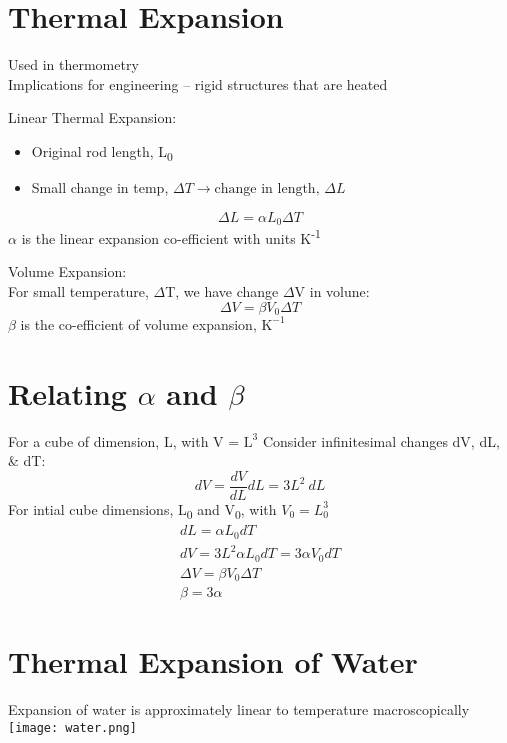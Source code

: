 \documentclass[a4paper, 11pt, fleqn, normalem]{report}
\begin{document}
\section{Thermal Expansion}
Used in thermometry \\
Implications for engineering -- rigid structures that are heated

Linear Thermal Expansion:
\begin{itemize}
    \item Original rod length, L\textsubscript{0}
    \item Small change in temp, ${\Delta}T \rightarrow \text{change in length, } {\Delta}L$
\end{itemize}
\begin{equation*}
    {\Delta}L = {\alpha}L_{0}{\Delta}T
\end{equation*}
$\alpha$ is the linear expansion co-efficient with units K\textsuperscript{-1}

Volume Expansion:\\
For small temperature, $\Delta$T, we have change $\Delta$V in volune:
\begin{equation*}
    {\Delta}V = {\beta}V_{0}{\Delta}T
\end{equation*}
$\beta$ is the co-efficient of volume expansion, $\text{K}^{-1}$

\section{Relating ${\alpha}$ and ${\beta}$}
For a cube of dimension, L, with V = $\text{L}^{3}$
Consider infinitesimal changes dV, dL, \& dT:
\begin{equation*}
	dV = \dfrac{dV}{dL}dL = 3L^{2}~dL
\end{equation*}
For intial cube dimensions, L\textsubscript{0} and V\textsubscript{0}, with $V_{0} = L_{0}^{3}$
\begin{gather*}
	dL = {\alpha}L_{0}dT \\
	dV = 3L^{2}{\alpha}L_{0}dT = 3{\alpha}V_{0}dT \\
	{\Delta}V = {\beta}V_{0}{\Delta}T \\
	\beta = 3\alpha
\end{gather*}

\section{Thermal Expansion of Water}
Expansion of water is approximately linear to temperature macroscopically \\
\texttt{[image: water.png]}
\end{document}
